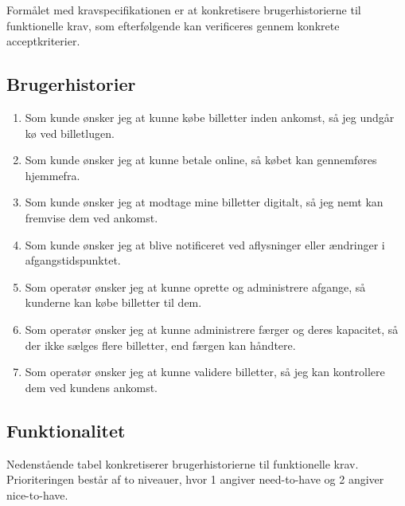 \documentclass[a4paper, 11pt]{article}
\begin{document}
Formålet med kravspecifikationen er at konkretisere brugerhistorierne til funktionelle krav,
som efterfølgende kan verificeres gennem konkrete acceptkriterier.

\subsection{Brugerhistorier}

\begin{enumerate}
\item Som kunde ønsker jeg at kunne købe billetter inden ankomst, så jeg undgår kø ved
billetlugen.

\item Som kunde ønsker jeg at kunne betale online, så købet kan gennemføres hjemmefra.

\item Som kunde ønsker jeg at modtage mine billetter digitalt, så jeg nemt kan fremvise dem
ved ankomst.

\item Som kunde ønsker jeg at blive notificeret ved aflysninger eller ændringer i
afgangstidspunktet.

\item Som operatør ønsker jeg at kunne oprette og administrere afgange, så kunderne kan købe
billetter til dem.

\item Som operatør ønsker jeg at kunne administrere færger og deres kapacitet, så der ikke
sælges flere billetter, end færgen kan håndtere.

\item Som operatør ønsker jeg at kunne validere billetter, så jeg kan kontrollere dem ved
kundens ankomst.
\end{enumerate}

\subsection{Funktionalitet}

Nedenstående tabel konkretiserer brugerhistorierne til funktionelle krav. Prioriteringen
består af to niveauer, hvor 1 angiver need-to-have og 2 angiver nice-to-have.
\end{document}
